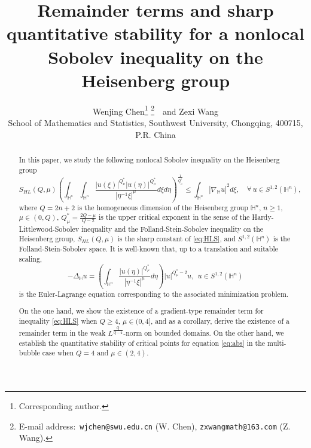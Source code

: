 \documentclass[11pt]{article}
\begin{document}
\title{Remainder terms and sharp
quantitative stability for a nonlocal Sobolev inequality on the Heisenberg group}


\author{Wenjing Chen\footnote{Corresponding author.} \footnote{E-mail address:\, {\tt wjchen@swu.edu.cn} (W. Chen), {\tt zxwangmath@163.com} (Z. Wang).}\  \ and Zexi Wang\\
\footnotesize  School of Mathematics and Statistics, Southwest University,
Chongqing, 400715, P.R. China}



\date{ }
\maketitle

\begin{abstract}
{
In this paper, we study the following nonlocal Sobolev inequality on the Heisenberg group
\begin{equation}\label{eq:HLS}
	S_{HL}(Q,\mu)	\left(\int_{\mathbb{H}^{n}}\int_{\mathbb{H}^{n}}\frac{|u(\xi)|^{Q^{\ast}_{\mu}}|u(\eta)|^{Q^{\ast}_{\mu}}}{|\eta^{-1}\xi|^{\mu}}{d}\xi{d}\eta\right)^{\frac{1}{Q^{\ast}_{\mu}}}\leq \int_{\mathbb{H}^{n}}|\nabla_{\mathbb{H}}u|^{2}d\xi,\quad \forall \,  u\in S^{1,2}(\mathbb{H}^{n}),
\end{equation}
where $Q=2n+2$ is the homogeneous dimension of the Heisenberg group $\mathbb{H}^{n}$, $n\geq1$, $\mu\in(0,Q)$, $Q^{\ast}_{\mu}=\frac{2Q-\mu}{Q-2}$ is the upper critical exponent in the sense of  the Hardy-Littlewood-Sobolev inequality and the Folland-Stein-Sobolev inequality on the Heisenberg group, $S_{HL}(Q,\mu)$ is  the sharp constant of \eqref{eq:HLS}, and $S^{1,2}(\mathbb{H}^{n})$ is the Folland-Stein-Sobolev space. %
It is well-known that, up to a translation and suitable scaling,
\begin{equation}\label{eq:abs}
  -\Delta_{\mathbb{H}} u=\left(\int_{\mathbb{H}^{n}}\frac{|u(\eta)|
^{Q^{\ast}_{\mu}}}{|\eta^{-1}\xi|^{\mu}}{d}\eta\right)|u|^{Q_\mu^*-2}u,~~u\in S^{1,2}(\mathbb{H}^{n})
\end{equation}
is the Euler-Lagrange equation corresponding to the associated minimization problem.

On the one hand, we show the existence of a gradient-type
remainder term for inequality \eqref{eq:HLS} when $Q\geq4$, $\mu\in (0,4]$, and  as a corollary, derive the existence of a remainder term in the weak $L^{\frac{Q}{Q-2}}$-norm on bounded domains. On the other hand, we establish the quantitative stability of critical points for equation \eqref{eq:abs} in the multi-bubble case when $Q=4$ and $\mu\in (2,4)$.
 }


\end{abstract}
\end{document}
